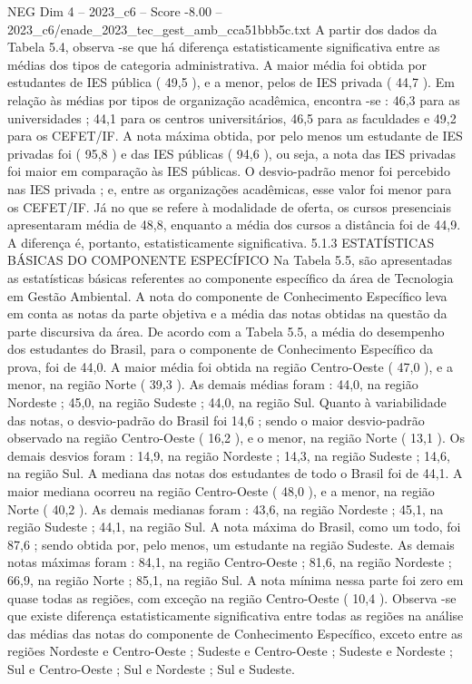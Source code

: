 \begin{textsample}{NEG Dim 4 – 2023\_c6 – Score -8.00 – 2023\_c6/enade\_2023\_tec\_gest\_amb\_cca51bbb5c.txt}
A partir dos dados da Tabela 5.4, observa -se que há diferença estatisticamente significativa entre as médias dos tipos de categoria administrativa.
A maior média foi obtida por estudantes de IES pública ( 49,5 ), e a menor, pelos de IES privada ( 44,7 ).
Em relação às médias por tipos de organização acadêmica, encontra -se : 46,3 para as universidades ; 44,1 para os centros universitários, 46,5 para as faculdades e 49,2 para os CEFET/IF.
A nota máxima obtida, por pelo menos um estudante de IES privadas foi ( 95,8 ) e das IES públicas ( 94,6 ), ou seja, a nota das IES privadas foi maior em comparação às IES públicas.
O desvio-padrão menor foi percebido nas IES privada ; e, entre as organizações acadêmicas, esse valor foi menor para os CEFET/IF.
Já no que se refere à modalidade de oferta, os cursos presenciais apresentaram média de 48,8, enquanto a média dos cursos a distância foi de 44,9.
A diferença é, portanto, estatisticamente significativa. 5.1.3 ESTATÍSTICAS BÁSICAS DO COMPONENTE ESPECÍFICO Na Tabela 5.5, são apresentadas as estatísticas básicas referentes ao componente específico da área de Tecnologia em Gestão Ambiental.
A nota do componente de Conhecimento Específico leva em conta as notas da parte objetiva e a média das notas obtidas na questão da parte discursiva da área.
De acordo com a Tabela 5.5, a média do desempenho dos estudantes do Brasil, para o componente de Conhecimento Específico da prova, foi de 44,0.
A maior média foi obtida na região Centro-Oeste ( 47,0 ), e a menor, na região Norte ( 39,3 ).
As demais médias foram : 44,0, na região Nordeste ; 45,0, na região Sudeste ; 44,0, na região Sul.
Quanto à variabilidade das notas, o desvio-padrão do Brasil foi 14,6 ; sendo o maior desvio-padrão observado na região Centro-Oeste ( 16,2 ), e o menor, na região Norte ( 13,1 ).
Os demais desvios foram : 14,9, na região Nordeste ; 14,3, na região Sudeste ; 14,6, na região Sul.
A mediana das notas dos estudantes de todo o Brasil foi de 44,1.
A maior mediana ocorreu na região Centro-Oeste ( 48,0 ), e a menor, na região Norte ( 40,2 ).
As demais medianas foram : 43,6, na região Nordeste ; 45,1, na região Sudeste ; 44,1, na região Sul.
A nota máxima do Brasil, como um todo, foi 87,6 ; sendo obtida por, pelo menos, um estudante na região Sudeste.
As demais notas máximas foram : 84,1, na região Centro-Oeste ; 81,6, na região Nordeste ; 66,9, na região Norte ; 85,1, na região Sul.
A nota mínima nessa parte foi zero em quase todas as regiões, com exceção na região Centro-Oeste ( 10,4 ).
Observa -se que existe diferença estatisticamente significativa entre todas as regiões na análise das médias das notas do componente de Conhecimento Específico, exceto entre as regiões Nordeste e Centro-Oeste ; Sudeste e Centro-Oeste ; Sudeste e Nordeste ; Sul e Centro-Oeste ; Sul e Nordeste ; Sul e Sudeste.

\end{textsample}
